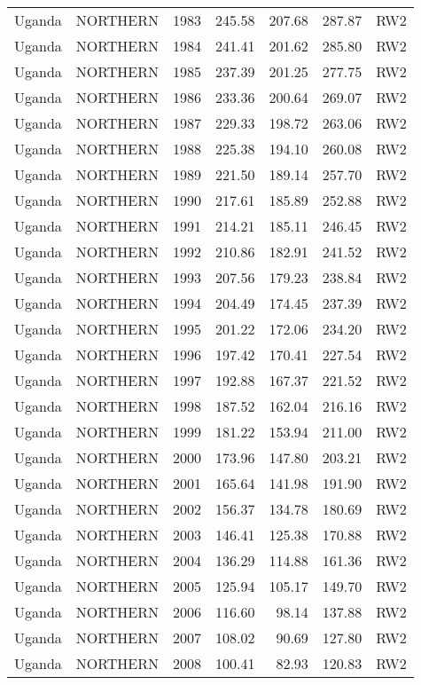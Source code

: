 \begin{longtable}{lllrrrl}
  Uganda & NORTHERN & 1983 & 245.58 & 207.68 & 287.87 & RW2 \\ 
  Uganda & NORTHERN & 1984 & 241.41 & 201.62 & 285.80 & RW2 \\ 
  Uganda & NORTHERN & 1985 & 237.39 & 201.25 & 277.75 & RW2 \\ 
  Uganda & NORTHERN & 1986 & 233.36 & 200.64 & 269.07 & RW2 \\ 
  Uganda & NORTHERN & 1987 & 229.33 & 198.72 & 263.06 & RW2 \\ 
  Uganda & NORTHERN & 1988 & 225.38 & 194.10 & 260.08 & RW2 \\ 
  Uganda & NORTHERN & 1989 & 221.50 & 189.14 & 257.70 & RW2 \\ 
  Uganda & NORTHERN & 1990 & 217.61 & 185.89 & 252.88 & RW2 \\ 
  Uganda & NORTHERN & 1991 & 214.21 & 185.11 & 246.45 & RW2 \\ 
  Uganda & NORTHERN & 1992 & 210.86 & 182.91 & 241.52 & RW2 \\ 
  Uganda & NORTHERN & 1993 & 207.56 & 179.23 & 238.84 & RW2 \\ 
  Uganda & NORTHERN & 1994 & 204.49 & 174.45 & 237.39 & RW2 \\ 
  Uganda & NORTHERN & 1995 & 201.22 & 172.06 & 234.20 & RW2 \\ 
  Uganda & NORTHERN & 1996 & 197.42 & 170.41 & 227.54 & RW2 \\ 
  Uganda & NORTHERN & 1997 & 192.88 & 167.37 & 221.52 & RW2 \\ 
  Uganda & NORTHERN & 1998 & 187.52 & 162.04 & 216.16 & RW2 \\ 
  Uganda & NORTHERN & 1999 & 181.22 & 153.94 & 211.00 & RW2 \\ 
  Uganda & NORTHERN & 2000 & 173.96 & 147.80 & 203.21 & RW2 \\ 
  Uganda & NORTHERN & 2001 & 165.64 & 141.98 & 191.90 & RW2 \\ 
  Uganda & NORTHERN & 2002 & 156.37 & 134.78 & 180.69 & RW2 \\ 
  Uganda & NORTHERN & 2003 & 146.41 & 125.38 & 170.88 & RW2 \\ 
  Uganda & NORTHERN & 2004 & 136.29 & 114.88 & 161.36 & RW2 \\ 
  Uganda & NORTHERN & 2005 & 125.94 & 105.17 & 149.70 & RW2 \\ 
  Uganda & NORTHERN & 2006 & 116.60 & 98.14 & 137.88 & RW2 \\ 
  Uganda & NORTHERN & 2007 & 108.02 & 90.69 & 127.80 & RW2 \\ 
  Uganda & NORTHERN & 2008 & 100.41 & 82.93 & 120.83 & RW2 \\ 

\end{longtable}
